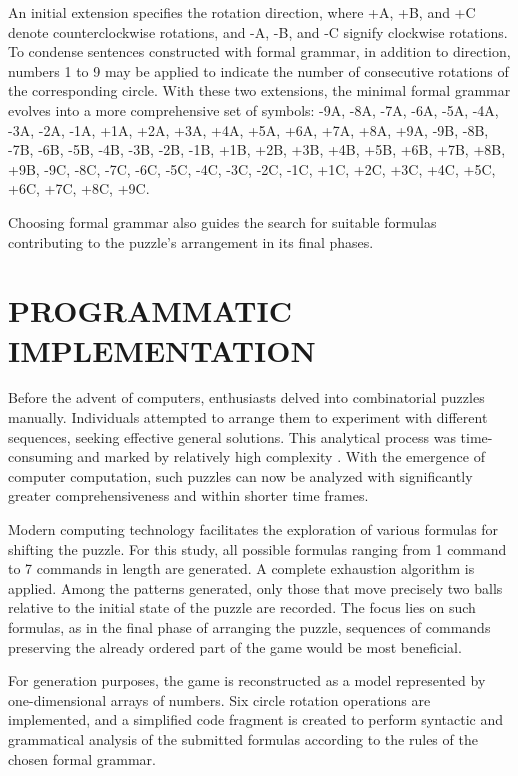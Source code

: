 \documentclass[a4paper,twocolumn,10pt]{article}
\begin{document}
An initial extension specifies the rotation direction, where +A, +B, and +C denote counterclockwise rotations, and -A, -B, and -C signify clockwise rotations. To condense sentences constructed with formal grammar, in addition to direction, numbers 1 to 9 may be applied to indicate the number of consecutive rotations of the corresponding circle. With these two extensions, the minimal formal grammar evolves into a more comprehensive set of symbols: -9A, -8A, -7A, -6A, -5A, -4A, -3A, -2A, -1A, +1A, +2A, +3A, +4A, +5A, +6A, +7A, +8A, +9A, -9B, -8B, -7B, -6B, -5B, -4B, -3B, -2B, -1B, +1B, +2B, +3B, +4B, +5B, +6B, +7B, +8B, +9B, -9C, -8C, -7C, -6C, -5C, -4C, -3C, -2C, -1C, +1C, +2C, +3C, +4C, +5C, +6C, +7C, +8C, +9C.

Choosing formal grammar also guides the search for suitable formulas contributing to the puzzle's arrangement in its final phases.

\section{PROGRAMMATIC IMPLEMENTATION}

Before the advent of computers, enthusiasts delved into combinatorial puzzles manually. Individuals attempted to arrange them to experiment with different sequences, seeking effective general solutions. This analytical process was time-consuming and marked by relatively high complexity \cite{Archer2007}. With the emergence of computer computation, such puzzles can now be analyzed with significantly greater comprehensiveness and within shorter time frames.

Modern computing technology facilitates the exploration of various formulas for shifting the puzzle. For this study, all possible formulas ranging from 1 command to 7 commands in length are generated. A complete exhaustion algorithm is applied\cite{Balabanov2024a}. Among the patterns generated, only those that move precisely two balls relative to the initial state of the puzzle are recorded. The focus lies on such formulas, as in the final phase of arranging the puzzle, sequences of commands preserving the already ordered part of the game would be most beneficial.

For generation purposes, the game is reconstructed as a model represented by one-dimensional arrays of numbers. Six circle rotation operations are implemented, and a simplified code fragment is created to perform syntactic and grammatical analysis of the submitted formulas according to the rules of the chosen formal grammar.
\end{document}
